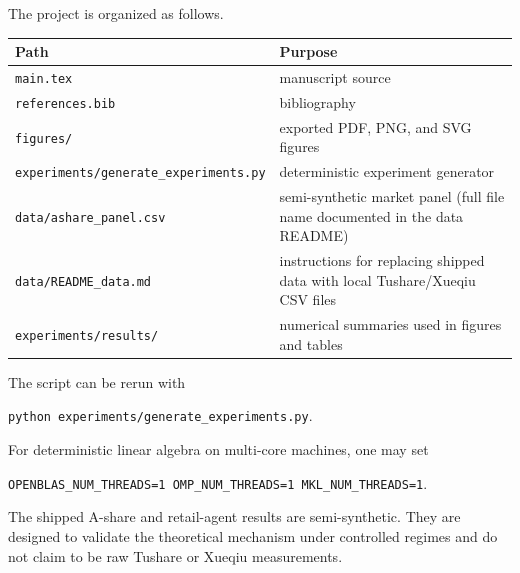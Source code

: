 \documentclass[11pt]{article}
\newcommand{\1}{\mathbf 1}
\begin{document}
The project is organized as follows.
\begin{center}
\small
\begin{tabularx}{\textwidth}{>{\raggedright\arraybackslash}p{}X}
\toprule
Path & Purpose \\
\midrule
\texttt{main.tex} & manuscript source \\
\texttt{references.bib} & bibliography \\
\texttt{figures/} & exported PDF, PNG, and SVG figures \\
\texttt{experiments/generate\_experiments.py} & deterministic experiment generator \\
\texttt{data/ashare\_panel.csv} & semi-synthetic market panel (full file name documented in the data README) \\
\texttt{data/README\_data.md} & instructions for replacing shipped data with local Tushare/Xueqiu CSV files \\
\texttt{experiments/results/} & numerical summaries used in figures and tables \\
\bottomrule
\end{tabularx}
\end{center}
The script can be rerun with
\begin{center}
\texttt{python experiments/generate\_experiments.py}.
\end{center}
For deterministic linear algebra on multi-core machines, one may set
\begin{center}
\texttt{OPENBLAS\_NUM\_THREADS=1 OMP\_NUM\_THREADS=1 MKL\_NUM\_THREADS=1}.
\end{center}
The shipped A-share and retail-agent results are semi-synthetic.  They are designed to validate the theoretical mechanism under controlled regimes and do not claim to be raw Tushare or Xueqiu measurements.
\end{document}
